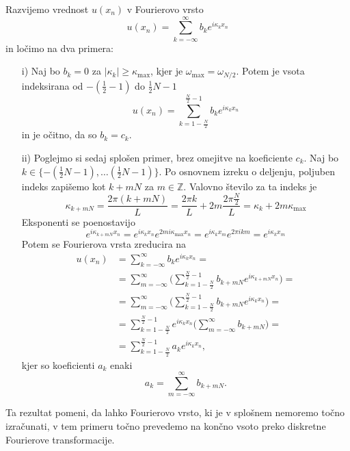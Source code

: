 \documentclass[mat2, tisk]{fmfdelo}
\newcommand{\Z}{\mathbb Z}
\begin{document}
\begin{dokaz}
Razvijemo vrednost $u(x_n)$ v Fourierovo vrsto 
$$
u(x_n) = \sum_{k=-\infty}^{\infty} b_k e^{i\kappa_k x_n}
$$
in ločimo na dva primera: \\
\begin{enumerate}
  \item[i)] Naj bo $b_k = 0$ za $|\kappa_k| \geq \kappa_{\text{max}}$, kjer je 
  $\omega_{\text{max}} = \omega_{N/2}$. Potem je vsota indeksirana od 
  $-(\frac{1}{2} - 1)$ do $\frac{1}{2}N - 1$
  $$
  u(x_n) = \sum_{k=1-\frac{N}{2}}^{\frac{N}{2}-1} b_k e^{i\kappa_k x_n}
  $$
  in je očitno, da so $b_k = c_k$. 
  \item[ii)] Poglejmo si sedaj splošen primer, brez omejitve na koeficiente 
  $c_k$. Naj bo $k \in \{-(\frac{1}{2}N - 1), \dots (\frac{1}{2}N - 1)\}$. 
  Po osnovnem izreku o deljenju, poljuben indeks zapišemo kot
  $k + mN$ za $m\in \Z$. Valovno število za ta indeks je 
  $$
  \kappa_{k + mN} = \frac{2\pi (k + mN)}{L} = \frac{2\pi k}{L} + 2m\frac{2\pi \frac{N}{2}}{L} = \kappa_k + 2m \kappa_{\text{max}}
  $$
  Eksponenti se poenostavijo 
  $$
  e^{i \kappa_{k + mN} x_n} =  e^{i \kappa_{k} x_n}  e^{2mi\kappa_{\text{max}} x_n} = 
  e^{i\kappa_k x_m} e^{2\pi i k m} = e^{i\kappa_k x_m}
  $$
  Potem se Fourierova vrsta zreducira na 
  \begin{align*}
  u(x_n) &= \sum_{k=-\infty}^{\infty} b_k e^{i\kappa_k x_n} = \\
         &= \sum_{m=-\infty}^{\infty} \Big(\sum_{k=1-\frac{N}{2}}^{\frac{N}{2}-1} b_{k+mN} e^{i\kappa_{k+mN} x_n}\Big) =\\ 
         &= \sum_{m=-\infty}^{\infty} \Big(\sum_{k=1-\frac{N}{2}}^{\frac{N}{2}-1} b_{k+mN} e^{i\kappa_{k} x_n}\Big) =\\ 
         &= \sum_{k=1-\frac{N}{2}}^{\frac{N}{2}-1} e^{i\kappa_{k} x_n}\Big(\sum_{m=-\infty}^{\infty} b_{k+mN}\Big) =\\
         &= \sum_{k=1-\frac{N}{2}}^{\frac{N}{2}-1} a_k e^{i\kappa_{k} x_n},
\end{align*}
kjer so koeficienti $a_k$ enaki 
$$a_k = \sum_{m=-\infty}^{\infty} b_{k+mN}.$$
\end{enumerate}
\end{dokaz}

Ta rezultat pomeni, da lahko Fourierovo vrsto, ki je v splošnem nemoremo 
točno izračunati, v tem primeru točno prevedemo na končno vsoto preko 
diskretne Fourierove transformacije. \\
\end{document}

